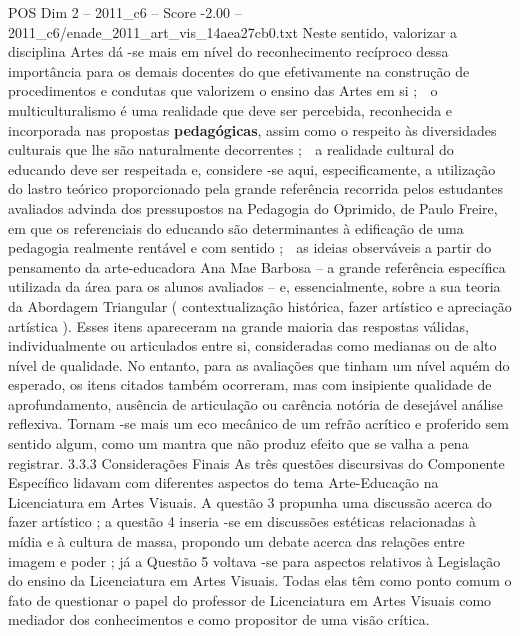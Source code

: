 \begin{textsample}{POS Dim 2 – 2011\_c6 – Score -2.00 – 2011\_c6/enade\_2011\_art\_vis\_14aea27cb0.txt}
Neste sentido, valorizar a disciplina Artes dá -se mais em nível do reconhecimento recíproco dessa importância para os demais docentes do que efetivamente na construção de procedimentos e condutas que valorizem o ensino das Artes em si ;  o multiculturalismo é uma realidade que deve ser percebida, reconhecida e incorporada nas propostas \textbf{pedagógicas}, assim como o respeito às diversidades culturais que lhe são naturalmente decorrentes ;  a realidade cultural do educando deve ser respeitada e, considere -se aqui, especificamente, a utilização do lastro teórico proporcionado pela grande referência recorrida pelos estudantes avaliados advinda dos pressupostos na Pedagogia do Oprimido, de Paulo Freire, em que os referenciais do educando são determinantes à edificação de uma pedagogia realmente rentável e com sentido ;  as ideias observáveis a partir do pensamento da arte-educadora Ana Mae Barbosa – a grande referência específica utilizada da área para os alunos avaliados – e, essencialmente, sobre a sua teoria da Abordagem Triangular ( contextualização histórica, fazer artístico e apreciação artística ).
Esses itens apareceram na grande maioria das respostas válidas, individualmente ou articulados entre si, consideradas como medianas ou de alto nível de qualidade.
No entanto, para as avaliações que tinham um nível aquém do esperado, os itens citados também ocorreram, mas com insipiente qualidade de aprofundamento, ausência de articulação ou carência notória de desejável análise reflexiva.
Tornam -se mais um eco mecânico de um refrão acrítico e proferido sem sentido algum, como um mantra que não produz efeito que se valha a pena registrar. 3.3.3 Considerações Finais As três questões discursivas do Componente Específico lidavam com diferentes aspectos do tema Arte-Educação na Licenciatura em Artes Visuais.
A questão 3 propunha uma discussão acerca do fazer artístico ; a questão 4 inseria -se em discussões estéticas relacionadas à mídia e à cultura de massa, propondo um debate acerca das relações entre imagem e poder ; já a Questão 5 voltava -se para aspectos relativos à Legislação do ensino da Licenciatura em Artes Visuais.
Todas elas têm como ponto comum o fato de questionar o papel do professor de Licenciatura em Artes Visuais como mediador dos conhecimentos e como propositor de uma visão crítica.

\end{textsample}
